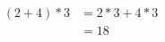 \documentclass{article}
\begin{document}
\begin{equation}
\begin{split}
(2+4)*3&=2*3+4*3\\
&=18
\end{split}
\end{equation}
\end{document}
